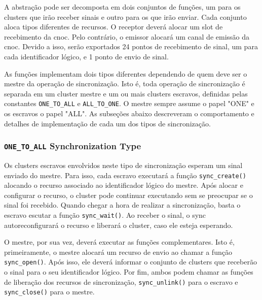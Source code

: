     A abstração \sync pode ser decomposta em dois conjuntos de funções, um para
    os clusters que irão receber sinais e outro para os que irão enviar.
    Cada conjunto aloca tipos diferentes de recursos.
    O receptor deverá alocar um slot de recebimento da cnoc.
    Pelo contrário, o emissor alocará um canal de emissão da cnoc.
    Devido a isso, serão exportados 24 pontos de recebimento de sinal,
    um para cada identificador lógico, e 1 ponto de envio de sinal.

    As funções implementam dois tipos diferentes dependendo de quem
    deve ser o mestre da operação de sincronização.
    Isto é, toda operação de sincronização é separada em um cluster mestre
    e um ou mais clusters escravos, definidas pelas constantes
    \texttt{ONE\_TO\_ALL} e \texttt{ALL\_TO\_ONE}.
    O mestre sempre assume o papel "ONE" e os escravos o papel "ALL".
    As subseções abaixo descreveram o comportamento e detalhes de implementação
    de cada um dos tipos de sincronização.

        \subsubsection*{\texttt{ONE\_TO\_ALL} Synchronization Type}

            Os clusters escravos envolvidos neste tipo de sincronização esperam
            um sinal enviado do mestre.
            Para isso, cada escravo executará a função \texttt{sync\_create()}
            alocando o recurso associado ao identificador lógico do mestre.
            Após alocar e configurar o recurso, o cluster pode continuar
            executando sem se preocupar se o sinal foi recebido.
            Quando chegar a hora de realizar a sincronização, basta o escravo
            escutar a função \texttt{sync\_wait()}.
            Ao receber o sinal, o sync autoreconfigurará o recurso e liberará o cluster,
            caso ele esteja esperando.

            O mestre, por sua vez, deverá executar as funções complementares.
            Isto é, primeiramente, o mestre alocará um recurso de envio
            ao chamar a função \texttt{sync\_open()}.
            Após isso, ele deverá informar o conjunto de clusters que
            receberão o sinal para o seu identificador lógico.
            Por fim, ambos podem chamar as funções de liberação dos recursos
            de sincronização, \texttt{sync\_unlink()} para o escravo e
            \texttt{sync\_close()} para o mestre.

